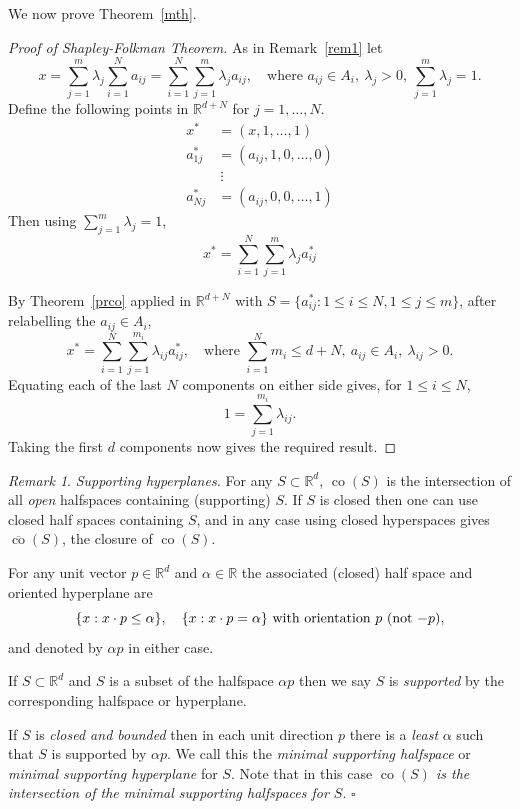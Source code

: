 \documentclass[a4paper]{amsart}
\theoremstyle{plain}
\theoremstyle{definition}
\theoremstyle{remark}
\newtheorem{remark}[theorem]{Remark}
\DeclareMathOperator{\co}{co}
\begin{document}
We now prove Theorem~\ref{mth}.
\begin{proof}[Proof of Shapley-Folkman Theorem]  As in Remark~\ref{rem1} let 
\[
 x =   \sum_{j=1}^m \lambda _j \sum_{i=1}^N a_{ij} = \sum_{i=1}^N \sum_{j=1} ^{m } \lambda _{j} a_{ij} ,
\quad \text{where }  a_{ij}\in A_i,  \ \lambda _{j} > 0 ,\ \sum_{j=1}^{m } \lambda _{j} = 1.
\]
Define the following points in $ \mathbb{R}^{d+N}  $ for $ j = 1,\dots, N $.
\begin{align*}
x^* &= (x,1,\dots, 1) \\
a_{1j}^* &= (a_{ij},1,0,\dots, 0 ) \\
            &\ \vdots \\
a_{Nj}^* &= (a_{ij},0,0,\dots, 1 )  
\end{align*}  
Then using  $  \sum_{j=1}^{m } \lambda _{j} = 1 $, 
\[
 x^*   = \sum_{i=1}^N \sum_{j=1} ^{m } \lambda _{j} a^*_{ij}  
\]

By Theorem~\ref{prco} applied in  $ \mathbb{R}^{d+N}  $ with $ S = \{ a^*_{ij}: 1\leq i \leq N, 1 \leq j \leq m    \} $, after relabelling the $ a_{ij} \in A_i $,
\[
 x^*  = \sum_{i=1}^N \sum_{j=1} ^{m_i } \lambda _{ij} a^*_{ij} ,
\quad \text{where }  \sum_{i=1}^N m_i \leq d + N,\  a_{ij}\in A_i,  \ \lambda _{ij} > 0 .
\]
Equating each of the last $ N $ components on either side gives, for $ 1 \leq i \leq N $,
\[ 1 = \sum_{j=1}^{m_i} \lambda _{ij} . \]
Taking the first $ d $ components now gives the required result.
\end{proof} 

\begin{remark}\emph{Supporting hyperplanes.}
For any $ S \subset \mathbb{R}^d  $, $ \co(S) $ is the intersection of all \emph{open} halfspaces containing (supporting) $ S $. If $ S $ is closed then one can use closed half spaces containing $ S $, and in any case using closed hyperspaces gives $ \overline{\co} (S) $, the closure of $ \co (S) $. 

For any   unit vector $ p \in \mathbb{R}^d  $ and $ \alpha \in \mathbb{R} $ the associated (closed) half space and oriented hyperplane are
\[
  \{ x : x \cdot p \leq \alpha \},  \quad 
  \{ x : x \cdot p = \alpha \} \text{ with orientation $p $ (not $ -p $)},
  \]
and denoted by $ \alpha p $ in either case.   

If $ S \subset \mathbb{R}^d  $ and $ S $ is a subset of the halfspace $ \alpha p $ then we say $ S $ is \emph{supported} by the corresponding halfspace or hyperplane.      

 If $ S $ is \emph{closed and bounded} then in each   unit direction $ p $ there is a \emph{least} $ \alpha $ such that $ S $ is supported by $ \alpha p $. 
We call this the   \emph{minimal supporting halfspace} or \emph{minimal supporting hyperplane} for $ S $. Note that in this case  \emph{$ \co(S )$ is the intersection of the minimal supporting halfspaces for $  S $}.
\hfill $\square$  \end{remark} 
\end{document}
